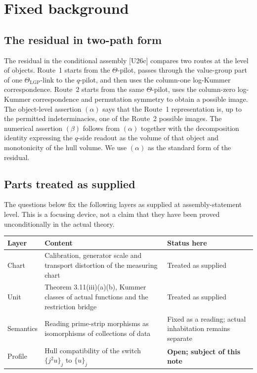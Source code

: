 \documentclass[11pt]{article}
\theoremstyle{definition}
\begin{document}
\section{Fixed background}\label{s:background}

\subsection{The residual in two-path form}

The residual in the conditional assembly [U26c] compares two
routes at the level of objects.  Route~1 starts from the
$\Theta$-pilot, passes through the value-group part of one
$\Theta_{\mathrm{LGP}}$-link to the $q$-pilot, and then uses the
column-one log-Kummer correspondence.  Route~2 starts from the
same $\Theta$-pilot, uses the column-zero log-Kummer
correspondence and permutation symmetry to obtain a possible
image.  The object-level assertion $(\alpha)$ says that the
Route~1 representation is, up to the permitted indeterminacies,
one of the Route~2 possible images.  The numerical assertion
$(\beta)$ follows from $(\alpha)$ together with the decomposition
identity expressing the $q$-side readout as the volume of that
object and monotonicity of the hull volume.  We use $(\alpha)$ as
the standard form of the residual.

\subsection{Parts treated as supplied}

The questions below fix the following layers as supplied at
assembly-statement level.  This is a focusing device, not a claim
that they have been proved unconditionally in the actual theory.

\begin{center}
\small
\begin{tabular}{@{}p{}p{}p{}@{}}
\toprule
Layer & Content & Status here\\
\midrule
Chart & Calibration, generator scale and transport distortion of the measuring chart & Treated as supplied\\
Unit & Theorem 3.11(iii)(a)(b), Kummer classes of actual functions and the restriction bridge & Treated as supplied\\
Semantics & Reading prime-strip morphisms as isomorphisms of collections of data & Fixed as a reading; actual inhabitation remains separate\\
Profile & Hull compatibility of the switch $\{j^2u\}_j$ to $\{u\}_j$ & \textbf{Open; subject of this note}\\
\bottomrule
\end{tabular}
\end{center}
\end{document}
